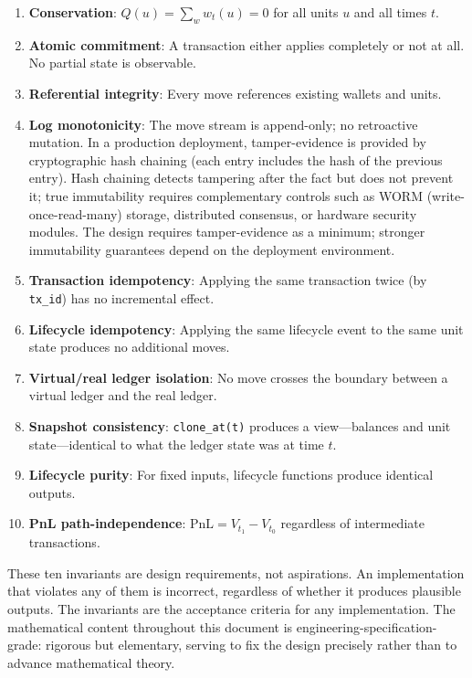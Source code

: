 \documentclass[11pt,a4paper]{article}
\begin{document}
\begin{enumerate}
\item \textbf{Conservation}: $Q(u) = \sum_{w} w_t(u) = 0$ for all units $u$ and all times $t$.
\item \textbf{Atomic commitment}: A transaction either applies completely or not at all. No partial state is observable.
\item \textbf{Referential integrity}: Every move references existing wallets and units.
\item \textbf{Log monotonicity}: The move stream is append-only; no retroactive mutation. In a production deployment, tamper-evidence is provided by cryptographic hash chaining (each entry includes the hash of the previous entry). Hash chaining detects tampering after the fact but does not prevent it; true immutability requires complementary controls such as WORM (write-once-read-many) storage, distributed consensus, or hardware security modules. The design requires tamper-evidence as a minimum; stronger immutability guarantees depend on the deployment environment.
\item \textbf{Transaction idempotency}: Applying the same transaction twice (by \texttt{tx\_id}) has no incremental effect.
\item \textbf{Lifecycle idempotency}: Applying the same lifecycle event to the same unit state produces no additional moves.
\item \textbf{Virtual/real ledger isolation}: No move crosses the boundary between a virtual ledger and the real ledger.
\item \textbf{Snapshot consistency}: \texttt{clone\_at(t)} produces a view---balances and unit state---identical to what the ledger state was at time $t$.
\item \textbf{Lifecycle purity}: For fixed inputs, lifecycle functions produce identical outputs.
\item \textbf{PnL path-independence}: $\text{PnL} = V_{t_1} - V_{t_0}$ regardless of intermediate transactions.
\end{enumerate}

These ten invariants are design requirements, not aspirations. An implementation that violates any of them is incorrect, regardless of whether it produces plausible outputs. The invariants are the acceptance criteria for any implementation. The mathematical content throughout this document is engineering-specification-grade: rigorous but elementary, serving to fix the design precisely rather than to advance mathematical theory.
\end{document}
